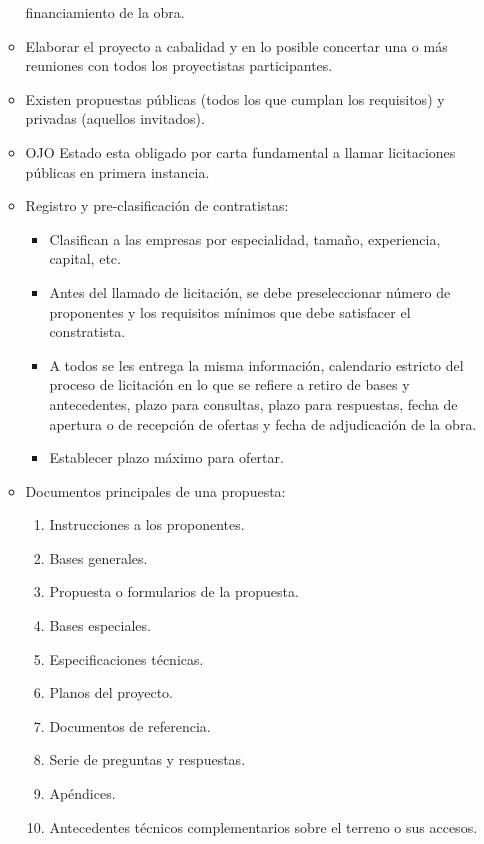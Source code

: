 \documentclass{article} %
\begin{document}
\begin{enumerate}
\begin{itemize}
        financiamiento de la obra.
        \item Elaborar el proyecto a cabalidad y en lo posible concertar una o más reuniones con todos
        los proyectistas participantes.
        \item Existen propuestas públicas (todos los que cumplan los requisitos) y privadas (aquellos invitados).
        \item OJO Estado esta obligado por carta fundamental a llamar licitaciones públicas en primera instancia.
        \item Registro y pre-clasificación de contratistas:
        \begin{itemize}
            \item Clasifican a las empresas por especialidad, tamaño, experiencia, capital, etc.
            \item Antes del llamado de licitación, se debe preseleccionar número de proponentes y los requisitos mínimos que debe satisfacer el constratista.
            \item A todos se les entrega la misma información, calendario estricto del proceso de licitación en lo que se refiere a retiro de
            bases y antecedentes, plazo para consultas, plazo para respuestas, fecha de apertura o de
            recepción de ofertas y fecha de adjudicación de la obra.
            \item Establecer plazo máximo para ofertar.
        \end{itemize}
        \item Documentos principales de una propuesta:
        \begin{enumerate}
            \item Instrucciones a los proponentes.
            \item Bases generales.
            \item Propuesta o formularios de la propuesta.
            \item Bases especiales.
            \item Especificaciones técnicas.
            \item Planos del proyecto.
            \item Documentos de referencia.
            \item Serie de preguntas y respuestas.
            \item Apéndices.
            \item Antecedentes técnicos complementarios sobre el terreno o sus accesos.
        \end{enumerate}

\end{itemize}
\end{enumerate}
\end{document}
